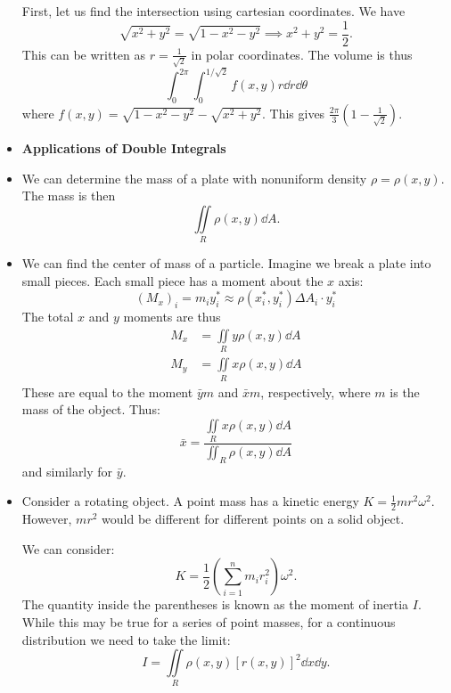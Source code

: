 \begin{itemize}
\begin{example}
        First, let us find the intersection using cartesian coordinates. We have 
        \begin{equation}
            \sqrt{x^2+y^2}=\sqrt{1-x^2-y^2}\implies x^2+y^2 = \frac{1}{2}.
        \end{equation}
        This can be written as $r=\frac{1}{\sqrt{2}}$ in polar coordinates. The volume is thus 
        \begin{equation}
            \int_0^{2\pi} \int_0^{1/\sqrt{2}}f(x,y) r\dd{r}\dd{\theta}
        \end{equation}
        where $f(x,y)=\sqrt{1-x^2-y^2}-\sqrt{x^2+y^2}$. This gives $\frac{2\pi}{3}\left(1-\frac{1}{\sqrt{2}}\right).$
    \end{example}
    \item \textbf{Applications of Double Integrals}
    \item We can determine the mass of a plate with nonuniform density $\rho = \rho(x,y)$. The mass is then 
    \begin{equation}
        \iint\limits_{R} \rho(x,y)\dd{A}.
    \end{equation}
    \item We can find the center of mass of a particle. Imagine we break a plate into small pieces. Each small piece has a moment about the $x$ axis: 
    \begin{equation}
        (M_x)_i = m_iy_i^* \approx \rho(x_i^*,y_i^*)\Delta A_i \cdot y_i^*
    \end{equation}
    The total $x$ and $y$ moments are thus 
    \begin{align}
        M_x &= \iint\limits_{R}y \rho(x,y)\dd{A} \\ 
        M_y &= \iint\limits_{R} x\rho(x,y)\dd{A}
    \end{align}
    These are equal to the moment $\bar{y}m$ and $\bar{x}m$, respectively, where $m$ is the mass of the object. Thus: 
    \begin{equation}
        \bar{x} = \frac{\iint\limits_{R} x\rho(x,y)\dd{A}}{\iint_{R}\rho(x,y)\dd{A}}
    \end{equation}
    and similarly for $\bar{y}$.
    \item Consider a rotating object. A point mass has a kinetic energy $K=\frac{1}{2}mr^2\omega^2$. However, $mr^2$ would be different for different points on a solid object.
    
    We can consider: 
    \begin{equation}
        K = \frac{1}{2}\left(\sum_{i=1}^n m_ir_i^2\right)\omega^2.
    \end{equation}
    The quantity inside the parentheses is known as the moment of inertia $I$. While this may be true for a series of point masses, for a continuous distribution we need to take the limit:
    \begin{equation}
        I = \iint\limits_{R} \rho(x,y) [r(x,y)]^2 \dd{x}\dd{y}.
    \end{equation}
\end{itemize}